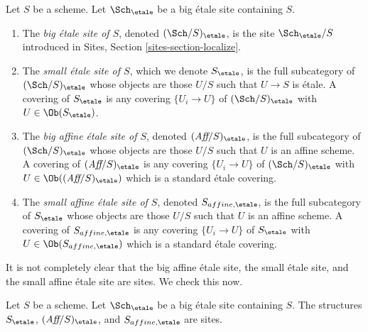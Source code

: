 \begin{definition}
\label{definition-big-small-etale}
Let $S$ be a scheme. Let $\Sch_\etale$ be a big \'etale
site containing $S$.
\begin{enumerate}
\item The {\it big \'etale site of $S$}, denoted
$(\Sch/S)_\etale$, is the site
$\Sch_\etale/S$ introduced in
Sites, Section \ref{sites-section-localize}.
\item The {\it small \'etale site of $S$}, which we denote
$S_\etale$, is the full subcategory of
$(\Sch/S)_\etale$
whose objects are those $U/S$ such that $U \to S$ is \'etale.
A covering of $S_\etale$ is any covering $\{U_i \to U\}$ of
$(\Sch/S)_\etale$ with $U \in \Ob(S_\etale)$.
\item The {\it big affine \'etale site of $S$}, denoted
$(\textit{Aff}/S)_\etale$, is the full subcategory of
$(\Sch/S)_\etale$ whose objects are those $U/S$
such that $U$ is an affine scheme.
A covering of $(\textit{Aff}/S)_\etale$ is any covering
$\{U_i \to U\}$ of $(\Sch/S)_\etale$ with $U \in \Ob((\textit{Aff}/S)_\etale)$
which is a standard \'etale covering.
\item The {\it small affine \'etale site of $S$}, denoted
$S_{affine, \etale}$, is the full subcategory of $S_\etale$
whose objects are those $U/S$ such that $U$ is an affine scheme.
A covering of $S_{affine, \etale}$ is any covering $\{U_i \to U\}$
of $S_\etale$ with $U \in \Ob(S_{affine, \etale})$ which is a standard
\'etale covering.
\end{enumerate}
\end{definition}

\noindent
It is not completely clear that the big affine \'etale site,
the small \'etale site, and the small affine \'etale site are sites.
We check this now.

\begin{lemma}
\label{lemma-verify-site-etale}
Let $S$ be a scheme. Let $\Sch_\etale$ be a big \'etale
site containing $S$.
The structures $S_\etale$, $(\textit{Aff}/S)_\etale$, and $S_{affine, \etale}$
are sites.
\end{lemma}

